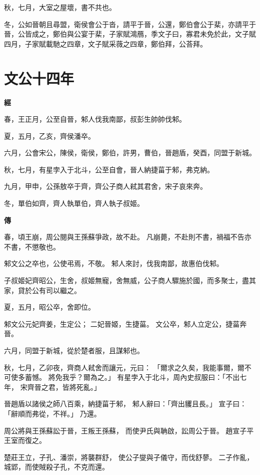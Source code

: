 \documentclass{ctexart}
\begin{document}
秋，七月，大室之屋壞，書不共也。

冬，公如晉朝且尋盟，衛侯會公于沓，請平于晉，公還，鄭伯會公于棐，亦請平于晉，公皆成之，鄭伯與公宴于棐，子家賦鴻鴈，季文子曰，寡君未免於此，文子賦四月，子家賦載馳之四章，文子賦采薇之四章，鄭伯拜，公荅拜。





\section{文公十四年}


\textbf{經}



春，王正月，公至自晉，邾人伐我南鄙，叔彭生帥帥伐邾。

夏，五月，乙亥，齊侯潘卒。

六月，公會宋公，陳侯，衛侯，鄭伯，許男，曹伯，晉趙盾，癸酉，同盟于新城。

秋，七月，有星孛入于北斗，公至自會，晉人納捷菑于邾，弗克納。

九月，甲申，公孫敖卒于齊，齊公子商人弒其君舍，宋子哀來奔。

冬，單伯如齊，齊人執單伯，齊人執子叔姬。

\textbf{傳}



春，頃王崩，周公閱與王孫蘇爭政，故不赴。
凡崩薨，不赴則不書，禍福不告亦不書，不懲敬也。

邾文公之卒也，公使弔焉，不敬。
邾人來討，伐我南鄙，故惠伯伐邾。

子叔姬妃齊昭公，生舍，叔姬無寵，舍無威，公子商人驟施於國，而多聚士，盡其家，貸於公有司以繼之。

夏，五月，昭公卒，舍即位。

邾文公元妃齊姜，生定公；
二妃晉姬，生捷菑。
文公卒，邾人立定公，捷菑奔晉。

六月，同盟于新城，從於楚者服，且謀邾也。

秋，七月，乙卯夜，齊商人弒舍而讓元，元曰：
「爾求之久矣，我能事爾，爾不可使多蓄憾。
將免我乎？爾為之。」
有星孛入于北斗，周內史叔服曰：「不出七年，
宋齊晉之君，皆將死亂。」

晉趙盾以諸侯之師八百乘，納捷菑于邾，
邾人辭曰：「齊出貜且長。」
宣子曰：「辭順而弗從，不祥。」
乃還。

周公將與王孫蘇訟于晉，王叛王孫蘇，
而使尹氏與聃啟，訟周公于晉。
趙宣子平王室而復之。

楚莊王立，子孔、潘崇，將襲群舒，
使公子燮與子儀守，而伐舒蓼。
二子作亂，城郢，而使賊殺子孔，不克而還。
\end{document}
